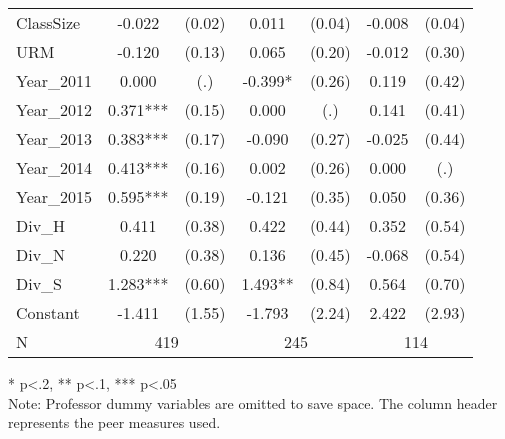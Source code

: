\begin{sidewaystable}[htb]
\begin{threeparttable}
\begin{tabular}{l|c|c|c|c|c|c}
      ClassSize           &      -0.022                       &      (0.02)   &       0.011                       &      (0.04)   &      -0.008                       &      (0.04)   \\
      URM                 &      -0.120                       &      (0.13)   &       0.065                       &      (0.20)   &      -0.012                       &      (0.30)   \\
      Year\_2011   &       0.000                       &         (.)   &      -0.399*                      &      (0.26)   &       0.119                       &      (0.42)   \\
      Year\_2012   &       0.371***                    &      (0.15)   &       0.000                       &         (.)   &       0.141                       &      (0.41)   \\
      Year\_2013   &       0.383***                    &      (0.17)   &      -0.090                       &      (0.27)   &      -0.025                       &      (0.44)   \\
      Year\_2014   &       0.413***                    &      (0.16)   &       0.002                       &      (0.26)   &       0.000                       &         (.)   \\
      Year\_2015   &       0.595***                    &      (0.19)   &      -0.121                       &      (0.35)   &       0.050                       &      (0.36)   \\
      Div\_H         &       0.411                       &      (0.38)   &       0.422                       &      (0.44)   &       0.352                       &      (0.54)   \\
      Div\_N         &       0.220                       &      (0.38)   &       0.136                       &      (0.45)   &      -0.068                       &      (0.54)   \\
      Div\_S         &       1.283***                    &      (0.60)   &       1.493**                     &      (0.84)   &       0.564                       &      (0.70)   \\
      Constant            &      -1.411                       &      (1.55)   &      -1.793                       &      (2.24)   &       2.422                       &      (2.93)   \\
      \hline
      N                 & \multicolumn{2}{|c}{419} & \multicolumn{2}{|c}{245} & \multicolumn{2}{|c}{114}               \\
      \hline
      \hline
    \end{tabular}
    \begin{tablenotes}
    \item{* p<.2, ** p<.1, *** p<.05 \\ Note: Professor dummy variables are omitted to save space. The column header represents the peer measures used.}
    \end{tablenotes}
  \end{threeparttable}
\end{sidewaystable}

